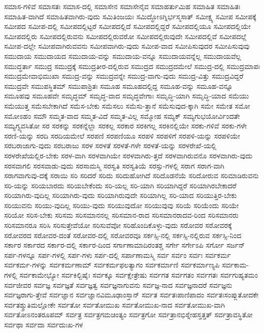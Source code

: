 {ಸಮಾಸ-ಗಳಿವೆ
ಸಮಾಸತಃ
ಸಮಾಸ-ದಲ್ಲಿ
ಸಮಾಸೇನ
ಸಮಾಸೇನೈವ
ಸಮಾಹರ್ತುಮಿಹ
ಸಮಾಹಿತ
ಸಮಾಹಿತಃ
ಸಮಾಹಿತ-ವಾಗಿದೆ
ಸಮಾಹಿತವಾಗಿರು-ವುದು
ಸಮಿತಿಂಜಯಃ
ಸಮಿದ್ಧೋಽಗ್ನಿರ್ಭಸ್ಮಸಾತ್
ಸಮೀಕ್ಷ್ಯ
ಸಮೀಪ
ಸಮೀಪಕ್ಕೆ
ಸಮೀಪದ
ಸಮೀಪ-ದಲ್ಲಿ
ಸಮೀಪದಲ್ಲಿಟ್ಟರೆ
ಸಮೀಪದಲ್ಲಿದೆ
ಸಮೀಪದಲ್ಲಿದ್ದರೆ
ಸಮೀಪದಲ್ಲಿಯೂ
ಸಮೀಪದಲ್ಲಿಯೇ
ಸಮೀಪದಲ್ಲಿರು
ಸಮೀಪದಲ್ಲಿರುವನು
ಸಮೀಪದಲ್ಲಿರುವರೋ
ಸಮೀಪದಲ್ಲಿರುವುದೇ
ಸಮೀಪದಲ್ಲಿವೆ
ಸಮೀಪದಲ್ಲೆ
ಸಮೀಪ-ದಲ್ಲೇ
ಸಮೀಪವಾಗಿರುವವನು
ಸಮೀಪವಾಗಿರು-ವುದು
ಸಮೀಪ-ವಾದ
ಸಮೀಪಿಸುವುದರ
ಸಮೀಪಿಸುವುವು
ಸಮುದಾಯ
ಸಮುದಾಯದ
ಸಮುದಾಯ-ವನ್ನು
ಸಮುದಾಯ-ವನ್ನೂ
ಸಮುದಾಯವನ್ನೆಲ್ಲ
ಸಮುದಾಯವೆಲ್ಲ
ಸಮುದ್ಧರ್ತಾ
ಸಮುದ್ರ
ಸಮುದ್ರಕ್ಕೆ
ಸಮುದ್ರತೀರ-ದಲ್ಲಿರುವ
ಸಮುದ್ರದ
ಸಮುದ್ರದಮೇಲೆ
ಸಮುದ್ರ-ದಲ್ಲಿ
ಸಮುದ್ರಮಾಪಃ
ಸಮುದ್ರಮೇವಾಭಿಮುಖಾ
ಸಮುದ್ರ-ವನ್ನು
ಸಮುದ್ರವನ್ನೇ
ಸಮುದ್ರ-ವಾಗು-ವುದು
ಸಮುದ್ರ-ವಿತ್ತು
ಸಮುದ್ರವಿದ್ದರೆ
ಸಮುದ್ರವೇ
ಸಮುಪಸ್ಥಿತಮ್
ಸಮುಪಾಶ್ರಿತಃ
ಸಮೂಹ
ಸಮೂಹದಲ್ಲಿದ್ದ
ಸಮೂಹ-ವನ್ನು
ಸಮೂಹ-ವನ್ನೂ
ಸಮೂಹವು
ಸಮೂಹವೇ
ಸಮೃದ್ಧಮ್
ಸಮೃದ್ಧ-ವಾದ
ಸಮೃದ್ಧವೇಗಾಃ
ಸಮೃದ್ಧಿ-ಯಾಗಿ
ಸಮೃದ್ಧಿ-ಯಾದ
ಸಮೆಯು
ಸಮೆಯುತ್ತ
ಸಮೆಸಬೇಕಾಗಿದೆ
ಸಮೆಸ-ಬೇಕು
ಸಮೆಸಲು
ಸಮೆಸು-ತ್ತಾನೆ
ಸಮೆಸುವುದ-ಕ್ಕಾಗಿ
ಸಮೇ
ಸಮೇತ
ಸಮೋ
ಸಮೋಽಹಂ
ಸಮೌ
ಸಮ್ಮತ-ವಾದ
ಸಮ್ಮತ-ವಿದೆ
ಸಮ್ಮತ-ವಿಲ್ಲ
ಸಮ್ಮೋಹ
ಸಮ್ಯಕ್
ಸಮ್ಯಗುಭಯೋರ್ವಿಂದತೇ
ಸಮ್ಯಗ್ವ್ಯವಸಿತೋ
ಸರ
ಸರಕನ್ನು
ಸರಕನ್ನೆಲ್ಲಾ
ಸರಕಲ್ಲ
ಸರಕಾರ
ಸರಕಿಗಲ್ಲ
ಸರಕಿನಲ್ಲಿಯೇ
ಸರಕು-ಗಳಿವೆ
ಸರಕು-ಗಳೇ
ಸರಣಿ-ಯನ್ನು
ಸರದಿ
ಸರದಿಯಮೇಲೆ
ಸರಪಣಿ
ಸರಪಣಿಯೂ
ಸರಪಳಿ
ಸರಪಳಿಗೆ
ಸರಪಳಿ-ಯನ್ನು
ಸರಪಳಿಯೇ
ಸರಬರಾಜಾಗು-ವುದು
ಸರಬರಾಜು
ಸರಳ
ಸರಳತೆ
ಸರಳತೆ-ಗಳೇ
ಸರಳತೆ-ಯನ್ನು
ಸರಳರೇಖೆ-ಯಲ್ಲಿ
ಸರಳರೇಖೆಯಲ್ಲಿರ-ಬೇಕು
ಸರಳ-ವಾಗಿ
ಸರಳವಾಗಿಯೇ
ಸರಳವಾಗಿರು-ತ್ತದೆ
ಸರಳವಾಗಿರುವನೊ
ಸರಳವಾಗಿರು-ವುದು
ಸರಸವಾಗಲಿ
ಸರಸವಾಡು-ವುದು
ಸರಸಾಮಸ್ಮಿ
ಸರಸ್ವತಿ
ಸರಸ್ವತಿಯೆ
ಸರಸ್ಸು-ಗಳಲ್ಲಿ
ಸರಾಗ
ಸರಾಗ-ವಾಗಿ
ಸರಾಗವಾಗುವು-ದಕ್ಕೆ
ಸರಾಯಿ
ಸರಿ
ಸರಿದರೆ
ಸರಿದು
ಸರಿದುಹೋಗಿದೆ
ಸರಿದೊಡನೆಯೆ
ಸರಿದೋರುವ
ಸರಿಮಾಡಿರುವನು
ಸರಿ-ಯನ್ನು
ಸರಿಯಬಾರದು
ಸರಿಯಬೇಕೆಂದು
ಸರಿ-ಯಲ್ಲ
ಸರಿ-ಯಾಗಿ
ಸರಿಯಾಗಿದ್ದರೆ
ಸರಿಯಾಗಿರಬೇಕಾದರೆ
ಸರಿಯಾಗಿರು-ವುದಿಲ್ಲ
ಸರಿಯಾಗಿರು-ವುದು
ಸರಿಯಾಗಿರುವುದೇ
ಸರಿಯಾಗಿಲ್ಲ
ಸರಿ-ಯಾದ
ಸರಿಯುತ್ತಿರ-ಬೇಕು
ಸರಿಯುವನು
ಸರಿಯು-ವುದಿಲ್ಲ
ಸರಿಯು-ವುದು
ಸರಿಯುವುದೋ
ಸರಿಯುವುವು
ಸರಿಯೆ
ಸರಿಯೆಂದು
ಸರಿಯೇ
ಸರಿಯೋ
ಸರಿಸ-ಬೇಕು
ಸರಿಸಮ
ಸರಿಸಮಾನನಲ್ಲ
ಸರಿಸಮಾನ-ರಾದ
ಸರಿಸಮಾನರಾದವ-ರಿಂದ
ಸರಿಸಮಾನರು
ಸರಿಸಮಾನರೂ
ಸರಿಸಿ
ಸರಿಸುತ್ತೇವೆಯೋ
ಸರಿಸುವೆವೋ
ಸರಿಹೊಂದಿಕೊಳ್ಳು-ವುದು
ಸರೋವರ
ಸರೋವರಕ್ಕೆ
ಸರೋವರದ
ಸರೋವರ-ದಂತೆ
ಸರೋವರ-ದಲ್ಲಿ
ಸರೋವರವೂ
ಸರ್ಕಸ್ಸಿ-ನಲ್ಲಿ
ಸರ್ಕಸ್ಸಿ-ನಲ್ಲಿರುವ
ಸರ್ಕಸ್ಸಿ-ನಿಂದ
ಸರ್ಕಾರ
ಸರ್ಕಾರದ
ಸರ್ಕಾರ-ದಲ್ಲಿ
ಸರ್ಕಾರ-ದಿಂದ
ಸರ್ಗಾಣಾಮಾದಿರಂತಶ್ಚ
ಸರ್ಗೇ
ಸರ್ಗೇಽಪಿ
ಸರ್ಗೋ
ಸರ್ಜನ್
ಸರ್ಪ-ಗಳನ್ನೂ
ಸರ್ಪ-ಗಳಲ್ಲಿ
ಸರ್ಪ-ಗಳು
ಸರ್ಪ-ದಲ್ಲಿ
ಸರ್ಪಾಣಾಮಸ್ಮಿ
ಸರ್ವ
ಸರ್ವಂ
ಸರ್ವಃ
ಸರ್ವಕರ್ಮ
ಸರ್ವಕರ್ಮ-ಗಳನ್ನು
ಸರ್ವಕರ್ಮಣಾಮ್
ಸರ್ವಕರ್ಮಫಲತ್ಯಾಗಂ
ಸರ್ವಕರ್ಮಾಣಿ
ಸರ್ವಕರ್ಮಾಣ್ಯಪಿ
ಸರ್ವಕಾಮ-ಗಳಲ್ಲಿ
ಸರ್ವಕಾಮೇಭ್ಯೋ
ಸರ್ವಕಿಲ್ಬಿಷೈಃ
ಸರ್ವಕ್ಕೂ
ಸರ್ವಕ್ಷೇತ್ರೇಷು
ಸರ್ವಗತ
ಸರ್ವಗತಂ
ಸರ್ವಗತಃ
ಸರ್ವಗುಹ್ಯತಮಂ
ಸರ್ವಜೀವರ
ಸರ್ವಜ್ಞ
ಸರ್ವಜ್ಞತೆ
ಸರ್ವಜ್ಞತ್ವ
ಸರ್ವಜ್ಞನಾಗುವನು
ಸರ್ವಜ್ಞ-ನಾದ
ಸರ್ವಜ್ಞನಾದರೆ
ಸರ್ವಜ್ಞನು
ಸರ್ವಜ್ಞರಾಗು-ತ್ತೇವೆ
ಸರ್ವಜ್ಞಾನ
ಸರ್ವಜ್ಞಾನವಿಮೂಢಾಂಸ್ತಾನ್
ಸರ್ವತ
ಸರ್ವತಃಪಾಣಿಪಾದಂ
ಸರ್ವತಃಸಂಪ್ಲುತೋದಕೇ
ಸರ್ವತಶ್ಶ್ರುತಿಮಲ್ಲೋಕೇ
ಸರ್ವತೋ
ಸರ್ವತೋಮುಖ
ಸರ್ವತೋಮುಖ-ನಾದ
ಸರ್ವತೋಮುಖ-ವಾಗಿ
ಸರ್ವತೋಽನಂತರೂಪಮ್
ಸರ್ವತ್ರ
ಸರ್ವತ್ರಗಮಚಿಂತ್ಯಂ
ಸರ್ವತ್ರಗೋ
ಸರ್ವತ್ರಾನಭಿಸ್ನೇಹಸ್ತತ್ತತ್
ಸರ್ವತ್ರಾವಸ್ಥಿತೋ
ಸರ್ವಥಾ
ಸರ್ವದಾ
ಸರ್ವದುಃಖ-ಗಳ
}
